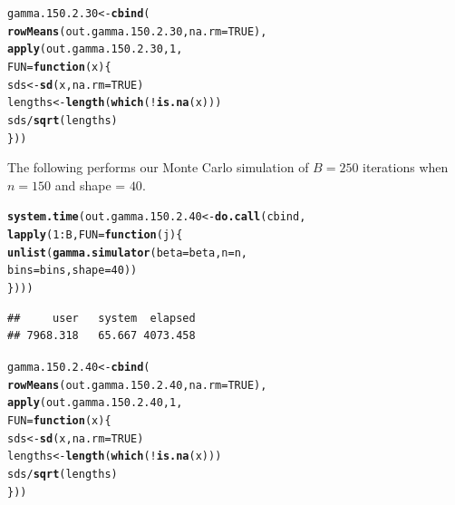 \documentclass[11pt]{article}\usepackage[]{graphicx}\usepackage[]{color}
\makeatletter
\newcommand{\hlnum}[1]{\textcolor[rgb]{0.686,0.059,0.569}{#1}}%
\newcommand{\hlopt}[1]{\textcolor[rgb]{0,0,0}{#1}}%
\newcommand{\hlstd}[1]{\textcolor[rgb]{0.345,0.345,0.345}{#1}}%
\newcommand{\hlkwa}[1]{\textcolor[rgb]{0.161,0.373,0.58}{\textbf{#1}}}%
\newcommand{\hlkwb}[1]{\textcolor[rgb]{0.69,0.353,0.396}{#1}}%
\newcommand{\hlkwc}[1]{\textcolor[rgb]{0.333,0.667,0.333}{#1}}%
\newcommand{\hlkwd}[1]{\textcolor[rgb]{0.737,0.353,0.396}{\textbf{#1}}}%
\newenvironment{kframe}{%
 \def\at@end@of@kframe{}%
 \ifinner\ifhmode%
  \def\at@end@of@kframe{\end{minipage}}%
  \begin{minipage}{\columnwidth}%
 \fi\fi%
 \def\FrameCommand##1{\hskip\@totalleftmargin \hskip-\fboxsep
 \colorbox{shadecolor}{##1}\hskip-\fboxsep
     \hskip-\linewidth \hskip-\@totalleftmargin \hskip\columnwidth}%
 \MakeFramed {\advance\hsize-\width
   \@totalleftmargin\z@ \linewidth\hsize
   \@setminipage}}%
 {\par\unskip\endMakeFramed%
 \at@end@of@kframe}
\newenvironment{knitrout}{}{} %
\makeatother
\begin{document}
\begin{knitrout}
\color{fgcolor}\begin{kframe}
\begin{alltt}
\hlstd{gamma.150.2.30} \hlkwb{<-} \hlkwd{cbind}\hlstd{(}
  \hlkwd{rowMeans}\hlstd{(out.gamma.150.2.30,} \hlkwc{na.rm} \hlstd{=} \hlnum{TRUE}\hlstd{),}
  \hlkwd{apply}\hlstd{(out.gamma.150.2.30,} \hlnum{1}\hlstd{,}
  \hlkwc{FUN} \hlstd{=} \hlkwa{function}\hlstd{(}\hlkwc{x}\hlstd{)\{}
    \hlstd{sds} \hlkwb{<-} \hlkwd{sd}\hlstd{(x,} \hlkwc{na.rm} \hlstd{=} \hlnum{TRUE}\hlstd{)}
    \hlstd{lengths} \hlkwb{<-} \hlkwd{length}\hlstd{(}\hlkwd{which}\hlstd{(}\hlopt{!}\hlkwd{is.na}\hlstd{(x)))}
    \hlstd{sds} \hlopt{/} \hlkwd{sqrt}\hlstd{(lengths)}
  \hlstd{\}))}
\end{alltt}
\end{kframe}
\end{knitrout}

The following performs our Monte Carlo simulation of $B = 250$ iterations 
when $n = 150$ and shape = $40$.

\begin{knitrout}
\color{fgcolor}\begin{kframe}
\begin{alltt}
\hlkwd{system.time}\hlstd{(out.gamma.150.2.40} \hlkwb{<-} \hlkwd{do.call}\hlstd{(cbind,}
  \hlkwd{lapply}\hlstd{(}\hlnum{1}\hlopt{:}\hlstd{B,} \hlkwc{FUN} \hlstd{=} \hlkwa{function}\hlstd{(}\hlkwc{j}\hlstd{)\{}
    \hlkwd{unlist}\hlstd{(}\hlkwd{gamma.simulator}\hlstd{(}\hlkwc{beta} \hlstd{= beta,} \hlkwc{n} \hlstd{= n,}
      \hlkwc{bins} \hlstd{= bins,} \hlkwc{shape} \hlstd{=} \hlnum{40}\hlstd{))}
\hlstd{\})))}
\end{alltt}
\begin{verbatim}
##     user   system  elapsed 
## 7968.318   65.667 4073.458
\end{verbatim}
\end{kframe}
\end{knitrout}

\begin{knitrout}
\color{fgcolor}\begin{kframe}
\begin{alltt}
\hlstd{gamma.150.2.40} \hlkwb{<-} \hlkwd{cbind}\hlstd{(}
  \hlkwd{rowMeans}\hlstd{(out.gamma.150.2.40,} \hlkwc{na.rm} \hlstd{=} \hlnum{TRUE}\hlstd{),}
  \hlkwd{apply}\hlstd{(out.gamma.150.2.40,} \hlnum{1}\hlstd{,}
  \hlkwc{FUN} \hlstd{=} \hlkwa{function}\hlstd{(}\hlkwc{x}\hlstd{)\{}
    \hlstd{sds} \hlkwb{<-} \hlkwd{sd}\hlstd{(x,} \hlkwc{na.rm} \hlstd{=} \hlnum{TRUE}\hlstd{)}
    \hlstd{lengths} \hlkwb{<-} \hlkwd{length}\hlstd{(}\hlkwd{which}\hlstd{(}\hlopt{!}\hlkwd{is.na}\hlstd{(x)))}
    \hlstd{sds} \hlopt{/} \hlkwd{sqrt}\hlstd{(lengths)}
  \hlstd{\}))}
\end{alltt}
\end{kframe}
\end{knitrout}
\end{document}
